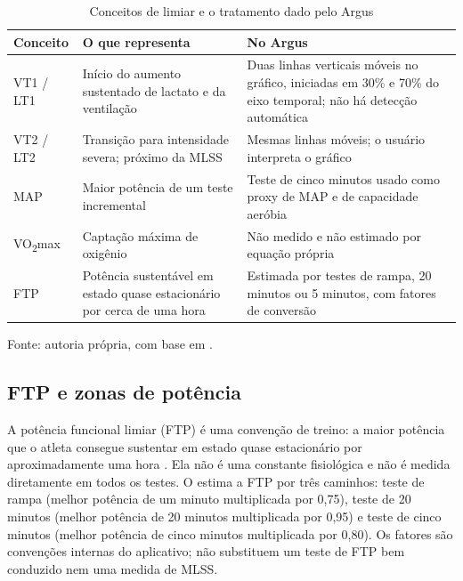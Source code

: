 \begin{table}[htbp]
    \centering
    \caption{Conceitos de limiar e o tratamento dado pelo Argus}
    \label{tab:limiares}
    \small
    \begin{tabular}{@{}>{\raggedright\arraybackslash}p{2.8cm}
        >{\raggedright\arraybackslash}p{5.0cm}
        >{\raggedright\arraybackslash}p{6.4cm}@{}}
        \toprule
        \textbf{Conceito} & \textbf{O que representa} & \textbf{No Argus} \\
        \midrule
        VT1 / LT1 & Início do aumento sustentado de lactato e da ventilação &
        Duas linhas verticais móveis no gráfico, iniciadas em 30\% e 70\% do
        eixo temporal; não há detecção automática \\
        VT2 / LT2 & Transição para intensidade severa; próximo da MLSS &
        Mesmas linhas móveis; o usuário interpreta o gráfico \\
        MAP & Maior potência de um teste incremental & Teste de cinco minutos
        usado como proxy de MAP e de capacidade aeróbia \\
        VO\textsubscript{2}max & Captação máxima de oxigênio & Não medido e
        não estimado por equação própria \\
        FTP & Potência sustentável em estado quase estacionário por cerca de
        uma hora & Estimada por testes de rampa, 20 minutos ou 5 minutos, com
        fatores de conversão \\
        \bottomrule
    \end{tabular}
    \vspace{0.2cm}
    \par\small Fonte: autoria própria, com base em
    \cite{faude2009,meyer2005,coggan2010}.
\end{table}

\subsection{FTP e zonas de potência}
\label{sec:ftp-zonas}

A potência funcional limiar (FTP) é uma convenção de treino: a maior potência
que o atleta consegue sustentar em estado quase estacionário por aproximadamente
uma hora \cite{coggan2010}. Ela não é uma constante fisiológica e não é medida
diretamente em todos os testes. O \argus{} estima a FTP por três caminhos:
teste de rampa (melhor potência de um minuto multiplicada por 0,75), teste de
20 minutos (melhor potência de 20 minutos multiplicada por 0,95) e teste de
cinco minutos (melhor potência de cinco minutos multiplicada por 0,80). Os
fatores são convenções internas do aplicativo; não substituem um teste de FTP
bem conduzido nem uma medida de MLSS.

